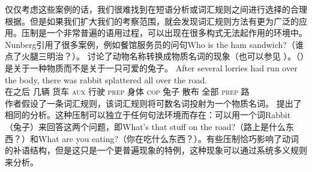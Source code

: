     仅仅考虑这些案例的话，我们很难找到在短语分析或词汇规则之间进行选择的合理根据。但是如果我们扩大我们的考察范围，就会发现词汇规则方法有更为广泛的应用。压制是一个非常普遍的语用过程，可以出现在很多构式无法起作用的环境中\citep{Nunberg95a-u}。Nunberg引用了很多案例，例如餐馆服务员的问句Who is the ham sandwich?（谁点了火腿三明治？）\citep[]{Nunberg95a-u}。 \citet[]{CB92a}讨论了动物名称转换成物质名词的现象（也可以参见 \citet[--43]{CB95a-u}）。（）是关于一种物质而不是关于一只可爱的兔子。
\ea
\gll After several lorries had run over the body, there was rabbit splattered all over the road.\\
     在之后 几辆 货车 \textsc{aux} 行驶 \textsc{prep}  身体 \expl{} \textsc{cop} 兔子 散布 全部 \textsc{prep}  路\\
\z
作者假设了一条词汇规则，该词汇规则将可数名词投射为一个物质名词。 \citet[--115]{Fillmore99a}提出了相同的分析。这种压制可以独立于任何句法环境而存在：可以用一个词Rabbit（兔子）来回答这两个问题，即What's that stuff on the road?（路上是什么东西？）和What are you eating?（你在吃什么东西？）。有些压制恰巧影响了动词的补语结构，但是这只是一个更普遍现象的特例，这种现象可以通过系统多义规则来分析。

